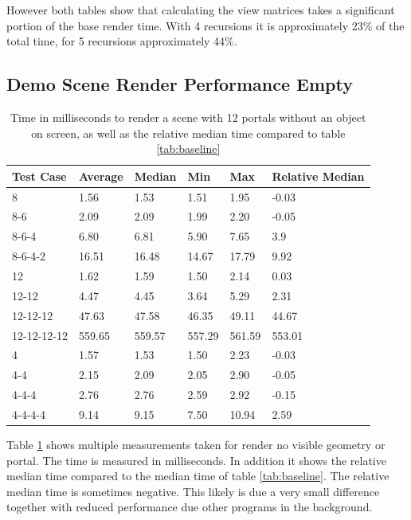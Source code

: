 However both tables show that calculating the view matrices takes a significant portion of the base render time. With 4 recursions it is approximately 23\% of the total time, for 5 recursions approximately 44\%. 

\subsection{Demo Scene Render Performance Empty}


\begin{table}[H]
	\centering
	\begin{tabular}{|l|l|l|l|l|l|}
		\hline
		Test Case   & Average & Median & Min    & Max    & Relative Median \\ \hline
		8           & 1.56    & 1.53   & 1.51   & 1.95   & -0.03           \\ \hline
		8-6         & 2.09    & 2.09   & 1.99   & 2.20   & -0.05           \\ \hline
		8-6-4       & 6.80    & 6.81   & 5.90   & 7.65   & 3.9             \\ \hline
		8-6-4-2     & 16.51   & 16.48  & 14.67  & 17.79  & 9.92            \\ \hline
		12          & 1.62    & 1.59   & 1.50   & 2.14   & 0.03            \\ \hline
		12-12       & 4.47    & 4.45   & 3.64   & 5.29   & 2.31            \\ \hline
		12-12-12    & 47.63   & 47.58  & 46.35  & 49.11  & 44.67           \\ \hline
		12-12-12-12 & 559.65  & 559.57 & 557.29 & 561.59 & 553.01          \\ \hline
		4           & 1.57    & 1.53   & 1.50   & 2.23   & -0.03           \\ \hline
		4-4         & 2.15    & 2.09   & 2.05   & 2.90   & -0.05           \\ \hline
		4-4-4       & 2.76    & 2.76   & 2.59   & 2.92   & -0.15           \\ \hline
		4-4-4-4     & 9.14    & 9.15   & 7.50   & 10.94  & 2.59            \\ \hline
	\end{tabular}
	\caption{Time in milliseconds to render a scene with 12 portals without an object on screen, as well as the relative median time compared to table \ref{tab:baseline}}
	\label{tab:rendernothing}
\end{table}


Table \ref{tab:rendernothing} shows multiple measurements taken for render no visible geometry or portal. The time is measured in milliseconds. In addition it shows the relative median time compared to the median time of table \ref{tab:baseline}. The relative median time is sometimes negative. This likely is due a very small difference together with reduced performance due other programs in the background.


